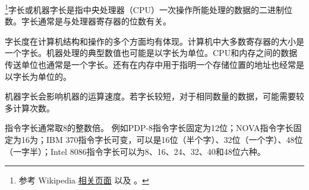 
\begin{issues}
\issueDraft
\end{issues}

\footnote{参考 Wikipedia \href{https://en.wikipedia.org/wiki/Word_(computer_architecture)}{相关页面} 以及 \cite{唐计}。}字长或机器字长是指中央处理器（CPU）一次操作所能处理的数据的二进制位数。字长通常是与处理器寄存器的位数有关。

字长度在计算机结构和操作的多个方面均有体现。计算机中大多数寄存器的大小是一个字长。机器处理的典型数值也可能是以字长为单位。CPU和内存之间的数据传送单位也通常是一个字长。还有在内存中用于指明一个存储位置的地址也经常是以字长为单位的。

机器字长会影响机器的运算速度。若字长较短，对于相同数量的数据，可能需要较多计算次数。

指令字长通常取8的整数倍。
例如PDP-8指令字长固定为12位；NOVA指令字长固定为16为；IBM 370指令字长可变，可以是16位（半个字）、32位（一个字）、48位（一字半）；Intel 8086指令字长可以为8、16、24、32、40和48位六种。
